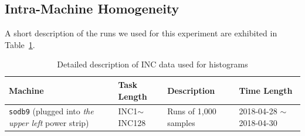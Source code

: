 \newpage
\clearpage

\subsection{Intra-Machine Homogeneity~\label{sec:intra_machine}} 

A short description of the runs we used for this experiment are exhibited in Table~\ref{tab:exp_notes3}.

\begin{table}[h]
\begin{center}
\begin{tabular}{|p{4cm}|p{3cm}|p{4cm}|p{4cm}|} \hline
Machine & Task Length & Description & Time Length\\ \hline
{\tt sodb9}  (plugged into {\em the upper left} power strip) &  INC1$\sim$INC128 & Runs of 1,000 samples & 2018-04-28 $\sim$2018-04-30\\ \hline
\end{tabular}
\end{center}
\vspace{-.2in}
\caption{Detailed description of INC data used for histograms\label{tab:exp_notes3}}
\end{table}


